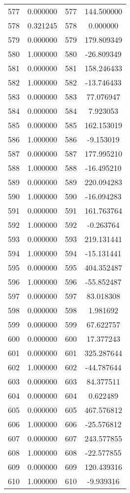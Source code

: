 \documentclass[12pt]{article}
\begin{document}
\begin{longtable}{@{}cccc@{}}
577 & 0.000000 & 577 & 144.500000 \\
578 & 0.321245 & 578 & 0.000000 \\
579 & 0.000000 & 579 & 179.809349 \\
580 & 1.000000 & 580 & -26.809349 \\
581 & 0.000000 & 581 & 158.246433 \\
582 & 1.000000 & 582 & -13.746433 \\
583 & 0.000000 & 583 & 77.076947 \\
584 & 0.000000 & 584 & 7.923053 \\
585 & 0.000000 & 585 & 162.153019 \\
586 & 1.000000 & 586 & -9.153019 \\
587 & 0.000000 & 587 & 177.995210 \\
588 & 1.000000 & 588 & -16.495210 \\
589 & 0.000000 & 589 & 220.094283 \\
590 & 1.000000 & 590 & -16.094283 \\
591 & 0.000000 & 591 & 161.763764 \\
592 & 1.000000 & 592 & -0.263764 \\
593 & 0.000000 & 593 & 219.131441 \\
594 & 1.000000 & 594 & -15.131441 \\
595 & 0.000000 & 595 & 404.352487 \\
596 & 1.000000 & 596 & -55.852487 \\
597 & 0.000000 & 597 & 83.018308 \\
598 & 0.000000 & 598 & 1.981692 \\
599 & 0.000000 & 599 & 67.622757 \\
600 & 0.000000 & 600 & 17.377243 \\
601 & 0.000000 & 601 & 325.287644 \\
602 & 1.000000 & 602 & -44.787644 \\
603 & 0.000000 & 603 & 84.377511 \\
604 & 0.000000 & 604 & 0.622489 \\
605 & 0.000000 & 605 & 467.576812 \\
606 & 1.000000 & 606 & -25.576812 \\
607 & 0.000000 & 607 & 243.577855 \\
608 & 1.000000 & 608 & -22.577855 \\
609 & 0.000000 & 609 & 120.439316 \\
610 & 1.000000 & 610 & -9.939316 \\

\end{longtable}
\end{document}
